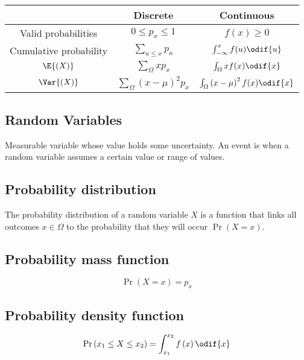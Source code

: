 \documentclass{article}
\begin{document}
\begin{minipage}{126.1962963mm}
    \begin{table}[H]
        \centering
        \begin{tabular}{c c c }
            \toprule
                                       & \textbf{Discrete}                              & \textbf{Continuous}                                    \\
            \midrule
            Valid probabilities        & \(0 \leq p_x \leq 1\)                          & \(f(x) \geq 0\)                                        \\
            Cumulative probability     & \(\sum_{u \leq x} p_u\)                        & \(\int_{-\infty}^{x} f(u) \odif{u}\)                   \\
            \(\E{\left( X \right)}\)   & \(\sum_{\Omega} xp_x\)                         & \(\int_{\Omega} xf(x)\odif{x}\)                        \\
            \(\Var{\left( X \right)}\) & \(\sum_{\Omega} \left( x - \mu \right)^2 p_x\) & \(\int_{\Omega} \left( x - \mu \right)^2f(x)\odif{x}\) \\
            \bottomrule
        \end{tabular}
    \end{table}
    \begin{multicols}{2}
        \section{Random Variables}
        Measurable variable whose value holds some uncertainty.
        An event is when a random variable assumes a certain value or range of values.
        \subsection{Probability distribution}
        The probability distribution of a random variable \(X\) is a function that links all outcomes \(x \in \Omega\)
        to the probability that they will occur \(\Pr{\left( X = x \right)}\).
        \subsection{Probability mass function}
        \begin{equation*}
            \Pr{\left( X = x \right)} = p_x
        \end{equation*}
        \subsection{Probability density function}
        \begin{equation*}
            \Pr{\left( x_1 \leq X \leq x_2 \right)} = \int_{x_1}^{x_2} f\left( x \right) \odif{x}
        \end{equation*}

\end{multicols}
\end{minipage}
\end{document}
